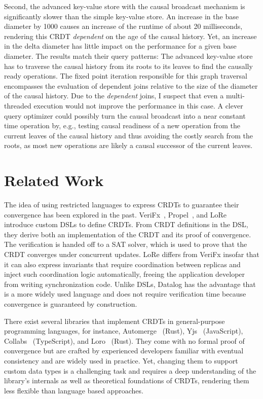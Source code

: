 Second, the advanced key-value store with the causal broadcast mechanism
is significantly slower than the simple key-value store.
An increase in the base diameter by 1000 causes an increase of the runtime of
about 20 milliseconds, rendering this \ac{CRDT} \emph{dependent} on the age
of the causal history.
Yet, an increase in the delta diameter has little impact on the performance
for a given base diameter.
The results match their query patterns:
The advanced key-value store has to traverse the causal history from its
roots to its leaves to find the causally ready operations.
The fixed point iteration responsible for this graph traversal encompasses the
evaluation of dependent joins relative to the size of the diameter of the causal
history.
Due to the \emph{dependent} joins, I suspect that even a multi-threaded execution
would not improve the performance in this case.
A clever query optimizer could possibly turn the causal broadcast into
a near constant time operation by, e.g., testing causal readiness of a new operation
from the current leaves of the causal history and thus avoiding the
costly search from the roots, as most new operations are likely a causal successor
of the current leaves.



\section{Related Work}\label{sec:related-work}

The idea of using restricted languages to express \acp{CRDT} to guarantee
their convergence has been explored in the past.
VeriFx~\cite{verifx}, Propel~\cite{propel}, and LoRe~\cite{lore} introduce
custom \acp{DSL} to define \acp{CRDT}.
From \ac{CRDT} definitions in the \ac{DSL}, they derive both an implementation
of the \ac{CRDT} and its proof of convergence.
The verification is handed off to a \acs{SAT} solver, which is used to
prove that the \ac{CRDT} converges under concurrent updates.
LoRe differs from VeriFx insofar that it can also express invariants that
require coordination between replicas and inject such coordination logic
automatically, freeing the application developer from writing synchronization
code.
Unlike \acp{DSL}, Datalog has the advantage that is a more widely used language
and does not require verification time because convergence is guaranteed by
construction.

There exist several libraries that implement \acp{CRDT} in general-purpose
programming languages, for instance, Automerge~\cite{automerge} (Rust),
Yjs~\cite{yjs} (JavaScript), Collabs~\cite{collabs} (TypeScript),
and Loro~\cite{loro} (Rust).
They come with no formal proof of convergence but are crafted by experienced
developers familiar with eventual consistency and are widely used in practice.
Yet, changing them to support custom data types is a challenging task and
requires a deep understanding of the library's internals as well as theoretical
foundations of \acp{CRDT}, rendering them less flexible than language based
approaches.

